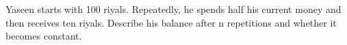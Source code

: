 Yaseen starts with 100 riyals. Repeatedly, he spends half his current money and then receives ten riyals. Describe his balance after n repetitions and whether it becomes constant.
